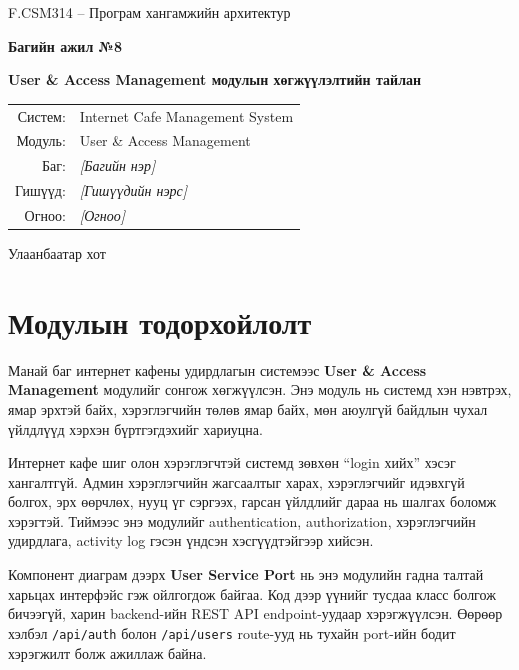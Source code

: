\documentclass[12pt,a4paper]{article}
\begin{document}
\begin{titlepage}
  \centering
  \vspace*{1.2cm}

  {\Large F.CSM314 -- Програм хангамжийн архитектур\par}
  \vspace{1.5cm}

  {\LARGE\bfseries Багийн ажил №8\par}
  \vspace{0.4cm}
  {\Large\bfseries User \& Access Management модулын хөгжүүлэлтийн тайлан\par}

  \vspace{2cm}

  \begin{tabular}{rl}
    Систем: & Internet Cafe Management System \\
    Модуль: & User \& Access Management \\
    Баг: & \textit{[Багийн нэр]} \\
    Гишүүд: & \textit{[Гишүүдийн нэрс]} \\
    Огноо: & \textit{[Огноо]} \\
  \end{tabular}

  \vfill
  {\large Улаанбаатар хот\par}
\end{titlepage}

\tableofcontents
\newpage

\section{Модулын тодорхойлолт}

Манай баг интернет кафены удирдлагын системээс \textbf{User \& Access Management} модулийг сонгож хөгжүүлсэн. Энэ модуль нь системд хэн нэвтрэх, ямар эрхтэй байх, хэрэглэгчийн төлөв ямар байх, мөн аюулгүй байдлын чухал үйлдлүүд хэрхэн бүртгэгдэхийг хариуцна.

Интернет кафе шиг олон хэрэглэгчтэй системд зөвхөн ``login хийх'' хэсэг хангалтгүй. Админ хэрэглэгчийн жагсаалтыг харах, хэрэглэгчийг идэвхгүй болгох, эрх өөрчлөх, нууц үг сэргээх, гарсан үйлдлийг дараа нь шалгах боломж хэрэгтэй. Тиймээс энэ модулийг authentication, authorization, хэрэглэгчийн удирдлага, activity log гэсэн үндсэн хэсгүүдтэйгээр хийсэн.

Компонент диаграм дээрх \textbf{User Service Port} нь энэ модулийн гадна талтай харьцах интерфэйс гэж ойлгогдож байгаа. Код дээр үүнийг тусдаа класс болгож бичээгүй, харин backend-ийн REST API endpoint-уудаар хэрэгжүүлсэн. Өөрөөр хэлбэл \texttt{/api/auth} болон \texttt{/api/users} route-ууд нь тухайн port-ийн бодит хэрэгжилт болж ажиллаж байна.
\end{document}
